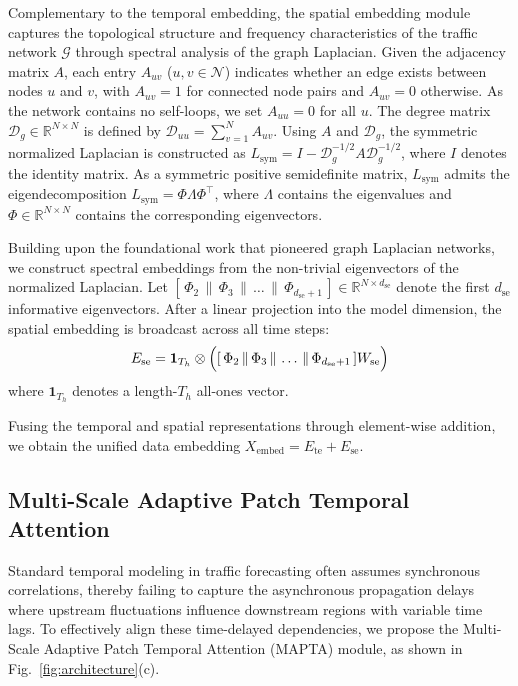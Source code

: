 \documentclass[5p,times,authoryear]{elsarticle}
\begin{document}
Complementary to the temporal embedding, the spatial embedding module captures the topological structure and frequency characteristics of the traffic network $\mathcal{G}$ through spectral analysis of the graph Laplacian. Given the adjacency matrix $A$, each entry $A_{uv}$ ($u,v\in\mathcal{N}$) indicates whether an edge exists between nodes $u$ and $v$, with $A_{uv}=1$ for connected node pairs and $A_{uv}=0$ otherwise. As the network contains no self-loops, we set $A_{uu}=0$ for all $u$. The degree matrix $\mathcal{D}_g\in\mathbb{R}^{N\times N}$ is defined by $\mathcal{D}_{uu}=\sum_{v=1}^{N}A_{uv}$. Using $A$ and $\mathcal{D}_g$, the symmetric normalized Laplacian is constructed as $L_{\mathrm{sym}} = I - \mathcal{D}_g^{-1/2} A \mathcal{D}_g^{-1/2}$, where $I$ denotes the identity matrix. As a symmetric positive semidefinite matrix, $L_{\mathrm{sym}}$ admits the eigendecomposition $L_{\mathrm{sym}} = \Phi \Lambda \Phi^\top$, where $\Lambda$ contains the eigenvalues and $\Phi \in \mathbb{R}^{N\times N}$ contains the corresponding eigenvectors.


Building upon the foundational work that pioneered graph Laplacian networks\citep{bruna2013spectral}, we construct spectral embeddings from the non-trivial eigenvectors of the normalized Laplacian. Let $[\,\Phi_2 \,\|\, \Phi_3 \,\|\, \ldots \,\|\, \Phi_{d_{\mathrm{se}}+1}\,] \in \mathbb{R}^{N \times d_{\mathrm{se}}}$ denote the first $d_{\mathrm{se}}$ informative eigenvectors. After a linear projection into the model dimension, the spatial embedding is broadcast across all time steps:
\vspace{-3pt}
\begin{equation}
E_{\mathrm{se}}
= \mathbf{1}_{T_h} \otimes 
\Bigl( [\,\Phi_2 \,\|\, \Phi_3 \,\|\, \ldots \,\|\, \Phi_{d_{\mathrm{se}}+1}\,] W_{\mathrm{se}} \Bigr)
\end{equation}
\vspace{-3pt}
where $\mathbf{1}_{T_h}$ denotes a length-$T_h$ all-ones vector.

Fusing the temporal and spatial representations through element-wise addition, we obtain the unified data embedding \(X_{\text{embed}} = E_{\mathrm{te}} + E_{\mathrm{se}}\).


\subsection{Multi-Scale Adaptive Patch Temporal Attention}
Standard temporal modeling in traffic forecasting often assumes synchronous correlations, thereby failing to capture the asynchronous propagation delays where upstream fluctuations influence downstream regions with variable time lags. To effectively align these time-delayed dependencies, we propose the Multi-Scale Adaptive Patch Temporal Attention (MAPTA) module, as shown in Fig.~\ref{fig:architecture}(c). 
\end{document}
